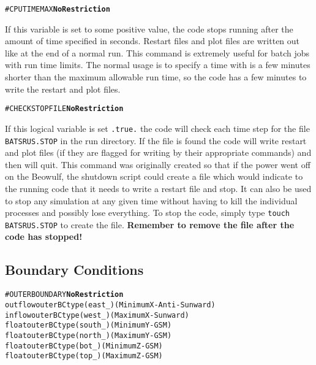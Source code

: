 \begin{alltt}
#CPUTIMEMAX \hfill {\bf No Restriction}
\end{alltt}

If this variable is set to some positive value, the code 
stops running after the amount of time
specified in seconds.  
Restart files and plot files are written out like at the end of a normal
run.  This command is extremely useful for batch jobs with run time limits.
The normal usage is to specify a time with is
a few minutes shorter than the maximum allowable run time, so the code
has a few minutes to write the restart and plot files.
\ \ \\



\begin{alltt}
#CHECKSTOPFILE \hfill {\bf No Restriction}
\end{alltt}

If this logical variable is set {\tt .true.} the code will check each
time step for the file {\tt BATSRUS.STOP} in the run directory.  If the
file is found the code will write restart and plot files (if they are
flagged for writing by their appropriate commands) and then will quit.
This command was originally created so that if the
power went off on the Beowulf, the shutdown script could create a file
which would indicate to the running code that it needs to write a
restart file and stop.  It can also be
used to stop any simulation at any given time without having to kill the 
individual processes and possibly lose everything.  To stop the code, 
simply type {\tt touch BATSRUS.STOP} to create the file. {\bf Remember to
remove the file after the code has stopped!}
\ \ \\


\subsection{Boundary Conditions \label{section:BC}}

\begin{alltt}
#OUTERBOUNDARY \hfill {\bf No Restriction}
outflow                outerBCtype(east_)  (Minimum X - Anti-Sunward) 
inflow                 outerBCtype(west_)  (Maximum X - Sunward) 
float                  outerBCtype(south_) (Minimum Y - GSM)
float                  outerBCtype(north_) (Maximum Y - GSM)
float                  outerBCtype(bot_)   (Minimum Z - GSM)
float                  outerBCtype(top_)   (Maximum Z - GSM)
\end{alltt}

